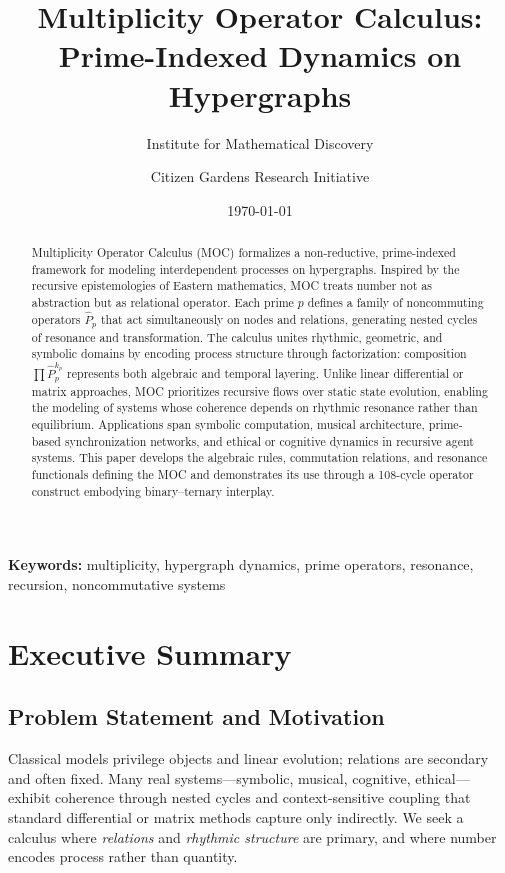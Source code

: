 \documentclass[12pt]{article}
\title{\textbf{Multiplicity Operator Calculus: Prime-Indexed Dynamics on Hypergraphs}}
\author[1]{Institute for Mathematical Discovery}
\author[2]{Citizen Gardens Research Initiative}
\affil[1]{Department of Mathematical Philosophy}
\affil[2]{Laboratory for Symbolic Systems and Consciousness}
\date{\today}
\numberwithin{equation}{section}
\theoremstyle{plain}
\theoremstyle{definition}
\theoremstyle{remark}
\begin{document}
\maketitle

\begin{abstract}
Multiplicity Operator Calculus (MOC) formalizes a non-reductive, prime-indexed framework for modeling interdependent processes on hypergraphs. Inspired by the recursive epistemologies of Eastern mathematics, MOC treats number not as abstraction but as relational operator. Each prime $p$ defines a family of noncommuting operators $\hat{P}_p$ that act simultaneously on nodes and relations, generating nested cycles of resonance and transformation. The calculus unites rhythmic, geometric, and symbolic domains by encoding process structure through factorization: composition $\prod \hat{P}_p^{k_p}$ represents both algebraic and temporal layering. Unlike linear differential or matrix approaches, MOC prioritizes recursive flows over static state evolution, enabling the modeling of systems whose coherence depends on rhythmic resonance rather than equilibrium. Applications span symbolic computation, musical architecture, prime-based synchronization networks, and ethical or cognitive dynamics in recursive agent systems. This paper develops the algebraic rules, commutation relations, and resonance functionals defining the MOC and demonstrates its use through a 108-cycle operator construct embodying binary–ternary interplay.
\end{abstract}

\noindent\textbf{Keywords:} multiplicity, hypergraph dynamics, prime operators, resonance, recursion, noncommutative systems

\section*{Executive Summary}

\subsection*{Problem Statement and Motivation}
Classical models privilege objects and linear evolution; relations are secondary and often fixed. Many real systems—symbolic, musical, cognitive, ethical—exhibit coherence through nested cycles and context-sensitive coupling that standard differential or matrix methods capture only indirectly. We seek a calculus where \emph{relations} and \emph{rhythmic structure} are primary, and where number encodes process rather than quantity.
\end{document}
